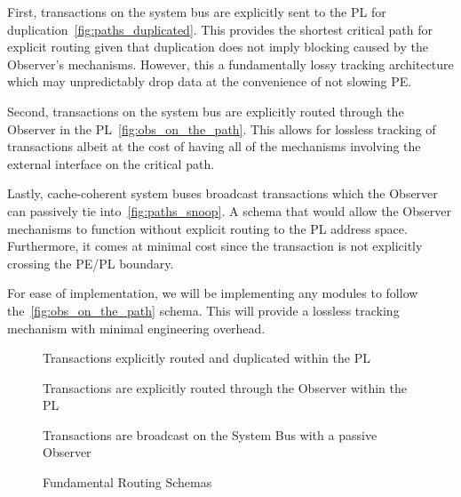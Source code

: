 
First, transactions on the system bus are explicitly sent to the PL for duplication~\ref{fig:paths_duplicated}. This provides the shortest critical path for explicit routing given that duplication does not imply blocking caused by the Observer's mechanisms. However, this a fundamentally lossy tracking architecture which may unpredictably drop data at the convenience of not slowing PE.

Second, transactions on the system bus are explicitly routed through the Observer in the PL~\ref{fig:obs_on_the_path}. This allows for lossless tracking of transactions albeit at the cost of having all of the mechanisms involving the external interface on the critical path.

Lastly, cache-coherent system buses broadcast transactions which the Observer can passively tie into~\ref{fig:paths_snoop}. A schema that would allow the Observer mechanisms to function without explicit routing to the PL address space. Furthermore, it comes at minimal cost since the transaction is not explicitly crossing the PE/PL boundary. 

For ease of implementation, we will be implementing any modules to follow the~\ref{fig:obs_on_the_path} schema. This will provide a lossless tracking mechanism with minimal engineering overhead. 

\begin{figure}
    \begin{minipage}[b]{0.32\textwidth}
        
        \caption{Transactions explicitly routed and duplicated within the PL}
        \label{fig:paths_duplicated}
    \end{minipage}
    \begin{minipage}[b]{0.32\textwidth}
        
        
        \caption{Transactions are explicitly routed through the Observer within the PL}
        \label{fig:obs_on_the_path}
    \end{minipage}
    \begin{minipage}[b]{0.32\textwidth}
        
        \caption{Transactions are broadcast on the System Bus with a passive Observer}
        \label{fig:paths_snoop}
    \end{minipage}
    \caption{Fundamental Routing Schemas}
    \label{fig:all_paths}
\end{figure}

